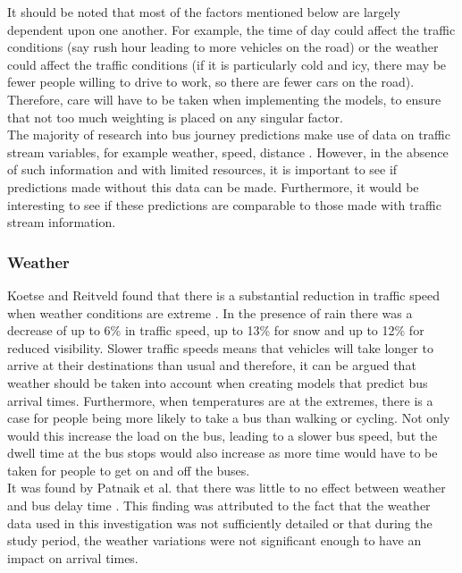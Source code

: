 It should be noted that most of the factors mentioned below are largely dependent upon one another. For example, the time of day could affect the traffic conditions (say rush hour leading to more vehicles on the road) or the weather could affect the traffic conditions (if it is particularly cold and icy, there may be fewer people willing to drive to work, so there are fewer cars on the road). Therefore, care will have to be taken when implementing the models, to ensure that not too much weighting is placed on any singular factor. \\

The majority of research into bus journey predictions make use of data on traffic stream variables, for example weather, speed, distance \cite{dynamic-gps}. However, in the absence of such information and with limited resources, it is important to see if predictions made without this data can be made. Furthermore, it would be interesting to see if these predictions are comparable to those made with traffic stream information.

\subsubsection{Weather}

Koetse and Reitveld found that there is a substantial reduction in traffic speed when weather conditions are extreme \cite{weather-transport-effect}. In the presence of rain there was a decrease of up to 6\% in traffic speed, up to 13\% for snow and up to 12\% for reduced visibility. Slower traffic speeds means that vehicles will take longer to arrive at their destinations than usual and therefore, it can be argued that weather should be taken into account when creating models that predict bus arrival times. Furthermore, when temperatures are at the extremes, there is a case for people being more likely to take a bus than walking or cycling. Not only would this increase the load on the bus, leading to a slower bus speed, but the dwell time at the bus stops would also increase as more time would have to be taken for people to get on and off the buses. \\

It was found by Patnaik et al. that there was little to no effect between weather and bus delay time \cite{apc-estimation}. This finding was attributed to the fact that the weather data used in this investigation was not sufficiently detailed or that during the study period, the weather variations were not significant enough to have an impact on arrival times. 

